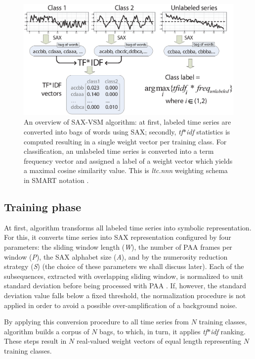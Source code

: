 \begin{figure}[t]
   \centering
   \includegraphics[width=140mm]{figures/overview.eps}
   \caption{
   An overview of SAX-VSM algorithm: 
   at first, labeled time series are converted into bags of words using SAX; 
   secondly, \textit{tf$\ast$idf} statistics is computed resulting in 
   a single weight vector per training class. For classification, an unlabeled 
   time series is converted into a term frequency vector and assigned a 
   label of a weight vector which yields a maximal cosine similarity value.
   This is \textit{ltc.nnn} weighting schema in SMART notation \cite{citeulike:4469058}.}
   \label{fig:overview}
\end{figure}

\subsection{Training phase}
At first, algorithm transforms all labeled 
time series into symbolic representation. For this, it converts time series into SAX
representation configured by four parameters: the sliding window 
length (\textit{W}), the number of PAA frames per window (\textit{P}), 
the SAX alphabet size (\textit{A}), and by the numerosity reduction strategy (\textit{S}) 
(the choice of  these parameters we shall discuss later).
Each of the subsequences, extracted with overlapping sliding window, 
is normalized to unit standard deviation before being processed with PAA 
\cite{citeulike:3815880}. 
If, however, the standard deviation value falls below a fixed threshold, the 
normalization procedure is not applied in order to avoid a possible over-amplification 
of a background noise.

By applying this conversion procedure to all time series from $N$ training classes, 
algorithm builds a corpus of $N$ bags, to which, in turn, it applies \textit{tf$\ast$idf} 
ranking. These steps result in $N$ real-valued weight vectors of equal length 
representing $N$ training classes. 

